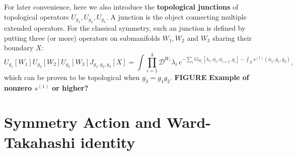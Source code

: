 \documentclass[
  letterpaper,
  DIV=11,
  numbers=noendperiod]{scrreport}
\begin{document}
For later convenience, here we also introduce the \textbf{topological
junctions} of topological operators \(U_{g_1},U_{g_2},U_{g_3}\). A
junction is the object connecting multiple extended operators. For the
classical symmetry, such an junction is defined by putting three (or
more) operators on submanifolds \(W_1,W_2\) and \(W_3\) sharing their
boundary \(X\): \[
U_{g_1}[W_1]U_{g_2}[W_2]U_{g_3}[W_3]J_{g_1,g_2,g_3}[X] 
=
\int\prod_{i=1}^3\mathcal{D}^{W_i}\lambda_i
\, e^{-\sum_i G_{W_i}[\lambda_i,\phi_i,\phi_{i+1},g_i]-\int_X s^{(1)}(\phi_1,g_1,g_2)},
\] which can be proven to be topological when \(g_3=g_1g_2\).
\textbf{FIGURE} \textbf{Example of nonzero \(s^{(1)}\) or higher?}

\section{Symmetry Action and Ward-Takahashi
identity}\label{symmetry-action-and-ward-takahashi-identity}
\end{document}
